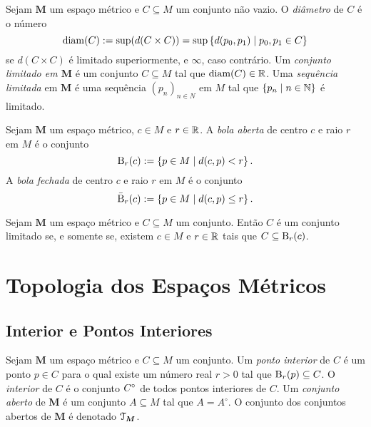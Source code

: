 \begin{defi}
Sejam $\bm M$ um espaço métrico e $C \subseteq M$ um conjunto não vazio. O \emph{diâmetro} de $C$ é o número
	\begin{equation*}
	\operatorname{diam}(C) := \sup(d(C \times C)) = \sup\left\{d(p_0,p_1) \;\middle\vert\; p_0,p_1 \in C \right\}
	\end{equation*}
se $d(C \times C)$ é limitado superiormente, e $\infty$, caso contrário. Um \emph{conjunto limitado em $\bm M$} é um conjunto $C \subseteq M$ tal que $\operatorname{diam}(C) \in \mathbb{R}$. Uma \emph{sequência limitada} em $\bm M$ é uma sequência $(p_n)_{n \in N}$ em $M$ tal que $\left\{p_n \;\middle\vert\; n \in \mathbb{N} \right\}$ é limitado.
\end{defi}

\begin{defi}
Sejam $\bm M$ um espaço métrico, $c \in M$ e $r \in \mathbb{R}$. A \emph{bola aberta} de centro $c$ e raio $r$ em $M$ é o conjunto
	\begin{equation*}
	\mathrm{B}_r(c) := \left\{p \in M \;\middle\vert\; d(c,p) < r \right\}.
	\end{equation*}
A \emph{bola fechada} de centro $c$ e raio $r$ em $M$ é o conjunto
	\begin{equation*}
	\bar{\mathrm{B}}_r(c) := \left\{p \in M \;\middle\vert\; d(c,p) \leq r \right\}.
	\end{equation*}
\end{defi}

\begin{prop}
Sejam $\bm M$ um espaço métrico e $C \subseteq M$ um conjunto. Então $C$ é um conjunto limitado se, e somente se, existem $c \in M$ e $r \in \mathbb{R}$ tais que $C \subseteq \mathrm{B}_r(c)$.
\end{prop}

\section{Topologia dos Espaços Métricos}

\subsection{Interior e Pontos Interiores}

\begin{defi}
Sejam $\bm M$ um espaço métrico e $C \subseteq M$ um conjunto. Um \emph{ponto interior} de $C$ é um ponto $p \in C$ para o qual existe um número real $r > 0$ tal que $\mathrm{B}_r(p) \subseteq C$. O \emph{interior} de $C$ é o conjunto ${C}^\circ$ de todos pontos interiores de $C$. Um \emph{conjunto aberto} de $\bm M$ é um conjunto $A \subseteq M$ tal que $A = A^\circ$. O conjunto dos conjuntos abertos de $\bm M$ é denotado $\mathcal{T}_{\bm M}$.
\end{defi}

